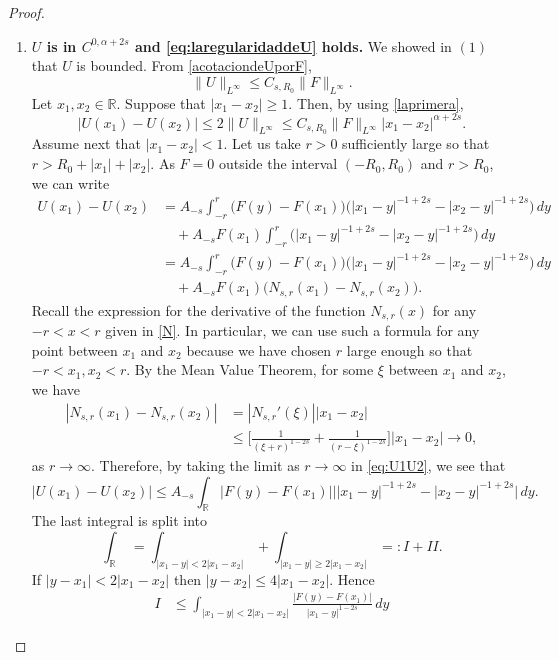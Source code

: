 \documentclass[a4paper,11pt,reqno]{amsart}
\newcommand{\R}{\mathbb{R}}
\theoremstyle{definition}
\numberwithin{equation}{section}
\begin{document}
\begin{proof}
\begin{enumerate}[$(1)$]
\item \textbf{$U$ is in $C^{0,\alpha+2s}$ and \eqref{eq:laregularidaddeU} holds.}
We showed in $(1)$ that $U$ is bounded. From \eqref{acotaciondeUporF},
\begin{equation}
\label{laprimera}
\|U\|_{L^\infty}\leq C_{s,R_0}\|F\|_{L^\infty}.
\end{equation}
Let $x_1,x_2\in\R$.
Suppose that $|x_1-x_2|\geq1$. Then, by using \eqref{laprimera},
\begin{equation}
\label{lasegunda}
|U(x_1)-U(x_2)| \leq 2\|U\|_{L^\infty}\leq C_{s,R_0}\|F\|_{L^\infty}|x_1-x_2|^{\alpha+2s}.
\end{equation}
Assume next that $|x_1-x_2|<1$. Let us take $r>0$ sufficiently large
so that $r>R_0+|x_1|+|x_2|$. As $F=0$ outside the interval $(-R_0,R_0)$ and $r>R_0$, we can write
\begin{equation}
\label{eq:U1U2}
\begin{aligned}
U(x_1)-U(x_2) &=A_{-s}\int_{-r}^r\big(F(y)-F(x_1)\big)\big(|x_1-y|^{-1+2s}-|x_2-y|^{-1+2s}\big)\,dy\\
&\quad+A_{-s}F(x_1)\int_{-r}^r\big(|x_1-y|^{-1+2s}-|x_2-y|^{-1+2s}\big)\,dy \\
&=A_{-s}\int_{-r}^r\big(F(y)-F(x_1)\big)\big(|x_1-y|^{-1+2s}-|x_2-y|^{-1+2s}\big)\,dy\\
&\quad+A_{-s}F(x_1)\big(N_{s,r}(x_1)-N_{s,r}(x_2)\big).
\end{aligned}
\end{equation}
Recall the expression for the derivative of the function
$N_{s,r}(x)$ for any $-r<x<r$ given in \eqref{N}.
In particular, we can use such a formula for any point between $x_1$ and $x_2$
because we have chosen $r$ large enough so that $-r<x_1,x_2<r$.
By the Mean Value Theorem, for some $\xi$ between $x_1$ and $x_2$, we have
\begin{align*}
|N_{s,r}(x_1)-N_{s,r}(x_2)| &= |N_{s,r}'(\xi)||x_1-x_2| \\
&\leq \bigg[\frac{1}{(\xi+r)^{1-2s}}+\frac{1}{(r-\xi)^{1-2s}}\bigg]|x_1-x_2|\to0,
\end{align*}
as $r\to\infty$.
Therefore, by taking the limit as $r\to\infty$ in \eqref{eq:U1U2}, we see that
$$
|U(x_1)-U(x_2)|\leq A_{-s}\int_{\R}|F(y)-F(x_1)|\big||x_1-y|^{-1+2s}-|x_2-y|^{-1+2s}\big|\,dy.
$$
The last integral is split into
$$
\int_\R~=\int_{|x_1-y|<2|x_1-x_2|}+\int_{|x_1-y|\geq2|x_1-x_2|}=:I+II.
$$
If $|y-x_1|<2|x_1-x_2|$ then $|y-x_2|\leq 4|x_1-x_2|$. Hence
\begin{align*}
I &\leq \int_{|x_1-y|<2|x_1-x_2|}\frac{|F(y)-F(x_1)|}{|x_1-y|^{1-2s}}\,dy

\end{align*}
\end{enumerate}
\end{proof}
\end{document}
